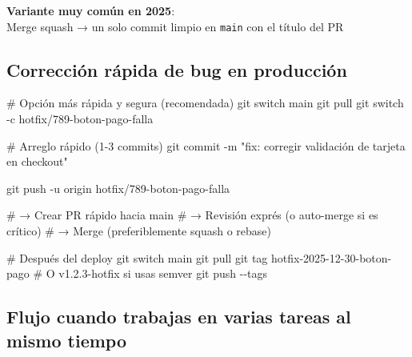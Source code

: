 \documentclass[
  doc,
  floatsintext,
  longtable,
  a4paper,
  nolmodern,
  notxfonts,
  notimes,
  12pt,
  colorlinks=true,linkcolor=blue,citecolor=blue,urlcolor=blue]{apa7}
\newenvironment{Shaded}{\begin{snugshade}}{\end{snugshade}}
\newcommand{\AttributeTok}[1]{\textcolor[rgb]{0.40,0.45,0.13}{#1}}
\newcommand{\CommentTok}[1]{\textcolor[rgb]{0.37,0.37,0.37}{#1}}
\newcommand{\FunctionTok}[1]{\textcolor[rgb]{0.28,0.35,0.67}{#1}}
\newcommand{\NormalTok}[1]{\textcolor[rgb]{0.00,0.23,0.31}{#1}}
\newcommand{\StringTok}[1]{\textcolor[rgb]{0.13,0.47,0.30}{#1}}
\begin{document}
\textbf{Variante muy común en 2025}:\\
Merge squash → un solo commit limpio en \texttt{main} con el título del
PR

\subsection{Corrección rápida de bug en
producción}\label{correcciuxf3n-ruxe1pida-de-bug-en-producciuxf3n}

\begin{Shaded}
\begin{Highlighting}[]
\CommentTok{\# Opción más rápida y segura (recomendada)}
\FunctionTok{git}\NormalTok{ switch main}
\FunctionTok{git}\NormalTok{ pull}
\FunctionTok{git}\NormalTok{ switch }\AttributeTok{{-}c}\NormalTok{ hotfix/789{-}boton{-}pago{-}falla}

\CommentTok{\# Arreglo rápido (1{-}3 commits)}
\FunctionTok{git}\NormalTok{ commit }\AttributeTok{{-}m} \StringTok{"fix: corregir validación de tarjeta en checkout"}

\FunctionTok{git}\NormalTok{ push }\AttributeTok{{-}u}\NormalTok{ origin hotfix/789{-}boton{-}pago{-}falla}

\CommentTok{\# → Crear PR rápido hacia main}
\CommentTok{\# → Revisión exprés (o auto{-}merge si es crítico)}
\CommentTok{\# → Merge (preferiblemente squash o rebase)}

\CommentTok{\# Después del deploy}
\FunctionTok{git}\NormalTok{ switch main}
\FunctionTok{git}\NormalTok{ pull}
\FunctionTok{git}\NormalTok{ tag hotfix{-}2025{-}12{-}30{-}boton{-}pago   }\CommentTok{\# O v1.2.3{-}hotfix si usas semver}
\FunctionTok{git}\NormalTok{ push }\AttributeTok{{-}{-}tags}
\end{Highlighting}
\end{Shaded}

\subsection{Flujo cuando trabajas en varias tareas al mismo
tiempo}\label{flujo-cuando-trabajas-en-varias-tareas-al-mismo-tiempo}
\end{document}
